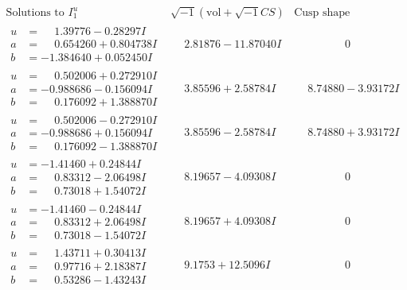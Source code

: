 \documentclass[1p]{elsarticle_modified}
\theoremstyle{definition}
\newcommand{\I}{\sqrt{-1}}
\begin{document}
$$\begin{array}{c|c|c}
\text{Solutions to }I^u_{1}& \I (\text{vol} + \sqrt{-1}CS) & \text{Cusp shape}\\
 \hline 
\begin{aligned}
u &= \phantom{-}1.39776 - 0.28297 I \\
a &= \phantom{-}0.654260 + 0.804738 I \\
b &= -1.384640 + 0.052450 I\end{aligned}
 & \phantom{-}2.81876 - 11.87040 I & \phantom{-0.000000 } 0 \\ \hline\begin{aligned}
u &= \phantom{-}0.502006 + 0.272910 I \\
a &= -0.988686 - 0.156094 I \\
b &= \phantom{-}0.176092 + 1.388870 I\end{aligned}
 & \phantom{-}3.85596 + 2.58784 I & \phantom{-}8.74880 - 3.93172 I \\ \hline\begin{aligned}
u &= \phantom{-}0.502006 - 0.272910 I \\
a &= -0.988686 + 0.156094 I \\
b &= \phantom{-}0.176092 - 1.388870 I\end{aligned}
 & \phantom{-}3.85596 - 2.58784 I & \phantom{-}8.74880 + 3.93172 I \\ \hline\begin{aligned}
u &= -1.41460 + 0.24844 I \\
a &= \phantom{-}0.83312 - 2.06498 I \\
b &= \phantom{-}0.73018 + 1.54072 I\end{aligned}
 & \phantom{-}8.19657 - 4.09308 I & \phantom{-0.000000 } 0 \\ \hline\begin{aligned}
u &= -1.41460 - 0.24844 I \\
a &= \phantom{-}0.83312 + 2.06498 I \\
b &= \phantom{-}0.73018 - 1.54072 I\end{aligned}
 & \phantom{-}8.19657 + 4.09308 I & \phantom{-0.000000 } 0 \\ \hline\begin{aligned}
u &= \phantom{-}1.43711 + 0.30413 I \\
a &= \phantom{-}0.97716 + 2.18387 I \\
b &= \phantom{-}0.53286 - 1.43243 I\end{aligned}
 & \phantom{-}9.1753 + 12.5096 I & \phantom{-0.000000 } 0 \\ \hline\begin{aligned}

\end{aligned}
\end{array}$$
\end{document}
